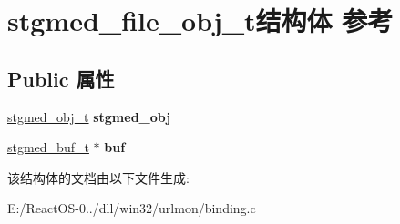 \hypertarget{structstgmed__file__obj__t}{}\section{stgmed\+\_\+file\+\_\+obj\+\_\+t结构体 参考}
\label{structstgmed__file__obj__t}
\subsection*{Public 属性}
\begin{DoxyCompactItemize}
\item 
\mbox{\label{structstgmed__file__obj__t_a109e16966795d7eef4925c2d06b9fbae}} 
\hyperlink{struct__stgmed__obj__t}{stgmed\+\_\+obj\+\_\+t} {\bfseries stgmed\+\_\+obj}
\item 
\mbox{\label{structstgmed__file__obj__t_ad9b20cb7198f5370cf032180845bd849}} 
\hyperlink{structstgmed__buf__t}{stgmed\+\_\+buf\+\_\+t} $\ast$ {\bfseries buf}
\end{DoxyCompactItemize}


该结构体的文档由以下文件生成\+:\begin{DoxyCompactItemize}
\item 
E\+:/\+React\+O\+S-\/0../dll/win32/urlmon/binding.\+c\end{DoxyCompactItemize}
